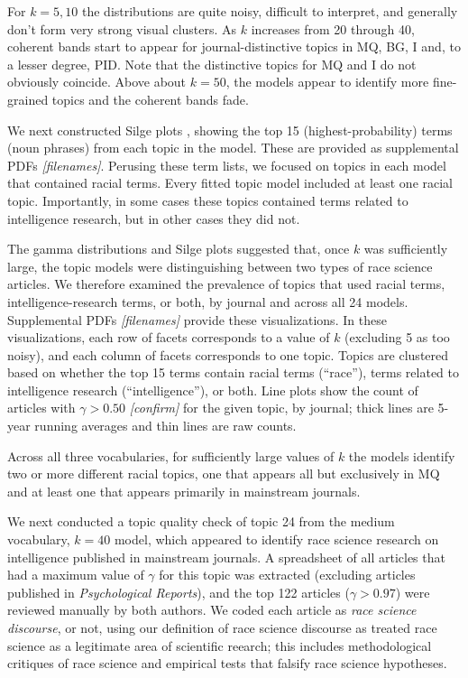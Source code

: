 \documentclass[12pt]{article}
\begin{document}
For \(k=5, 10\) the distributions are quite noisy, difficult to interpret, and generally don't form very strong visual clusters. As \(k\) increases from 20 through 40, coherent bands start to appear for journal-distinctive topics in MQ, BG, I and, to a lesser degree, PID. Note that the distinctive topics for MQ and I do not obviously coincide. Above about \(k=50\), the models appear to identify more fine-grained topics and the coherent bands fade.

We next constructed Silge plots \cite{SilgeTopicModeling2017}, showing the top 15 (highest-probability) terms (noun phrases) from each topic in the model. These are provided as supplemental PDFs \emph{{[}filenames{]}}. Perusing these term lists, we focused on topics in each model that contained racial terms. Every fitted topic model included at least one racial topic. Importantly, in some cases these topics contained terms related to intelligence research, but in other cases they did not.

The gamma distributions and Silge plots suggested that, once \(k\) was sufficiently large, the topic models were distinguishing between two types of race science articles. We therefore examined the prevalence of topics that used racial terms, intelligence-research terms, or both, by journal and across all 24 models. Supplemental PDFs \emph{{[}filenames{]}} provide these visualizations. In these visualizations, each row of facets corresponds to a value of \(k\) (excluding 5 as too noisy), and each column of facets corresponds to one topic. Topics are clustered based on whether the top 15 terms contain racial terms (``race''), terms related to intelligence research (``intelligence''), or both. Line plots show the count of articles with \(\gamma > 0.50\) \emph{{[}confirm{]}} for the given topic, by journal; thick lines are 5-year running averages and thin lines are raw counts.

Across all three vocabularies, for sufficiently large values of \(k\) the models identify two or more different racial topics, one that appears all but exclusively in MQ and at least one that appears primarily in mainstream journals.

We next conducted a topic quality check of topic 24 from the medium vocabulary, \(k=40\) model, which appeared to identify race science research on intelligence published in mainstream journals. A spreadsheet of all articles that had a maximum value of \(\gamma\) for this topic was extracted (excluding articles published in \emph{Psychological Reports}), and the top 122 articles (\(\gamma > 0.97\)) were reviewed manually by both authors. We coded each article as \emph{race science discourse}, or not, using our definition of race science discourse as treated race science as a legitimate area of scientific reearch; this includes methodological critiques of race science and empirical tests that falsify race science hypotheses.
\end{document}
